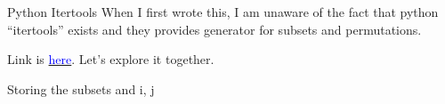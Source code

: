 \documentclass[11pt]{beamer}
\begin{document}
    \begin{frame}{Python Itertools}
        When I first wrote this, I am unaware of the fact that python ``itertools'' exists and they provides generator for subsets and permutations. 
        \vspace{2em}
        \par
        Link is \href{https://docs.python.org/3.10/library/itertools.html}{\textcolor{blue}{here}}. Let's explore it together. 
    \end{frame}
    \begin{frame}{Storing the subsets and i, j}
        
    \end{frame}
    
\end{document}
